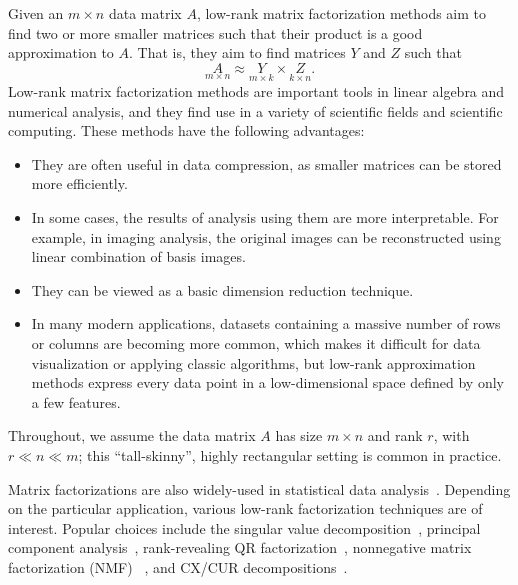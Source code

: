 
Given an $m \times n$ data matrix $A$, low-rank matrix factorization methods aim to find two or more smaller matrices such that their product is a good approximation to $A$.
That is, they aim to find matrices $Y$ and $Z$ such that
\begin{equation*}
 \label{eqn:apprx}
    \underset{m\times n}{A} \approx \underset{m\times k}{Y} \times \underset{k\times n}{Z}. 
\end{equation*}
Low-rank matrix factorization methods are important tools in linear algebra and numerical analysis, and they find use in a variety of scientific fields and scientific computing. These methods have the following advantages:
\begin{itemize}
  \item They are often useful in data compression, as smaller matrices can be stored more efficiently.
  \item In some cases, the results of analysis using them are more interpretable. For example, in imaging analysis, the original images can be reconstructed using linear combination of basis images.
  \item They can be viewed as a basic dimension reduction technique.
  \item In many modern applications, datasets containing a massive number of rows or columns are becoming more common, which makes it difficult for data visualization or applying classic algorithms, but low-rank approximation methods express every data point in a low-dimensional space defined by only a few features.
\end{itemize}
Throughout, we assume the data matrix $A$ has size $m \times n$ and rank $r$, with $r \ll n \ll m$; this ``tall-skinny'', highly rectangular setting is common in practice. 


Matrix factorizations are also widely-used in statistical data analysis~\cite{HMH00}.
Depending on the particular application, various low-rank factorization techniques are of interest. Popular choices include the singular value decomposition~\cite{GVL96}, principal component analysis~\cite{pcaBook}, rank-revealing QR factorization~\cite{GE96}, nonnegative matrix factorization (NMF) ~\cite{NMFalg}, and CX/CUR decompositions~\cite{CUR_PNAS}.

